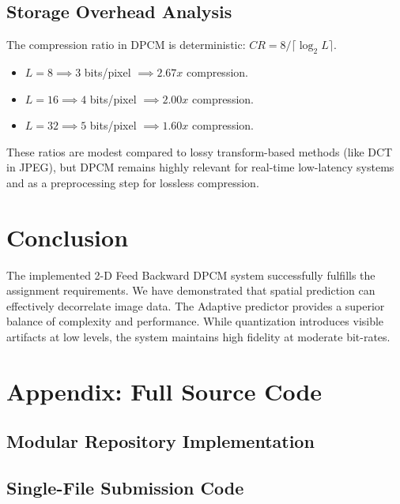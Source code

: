 \documentclass[12pt,a4paper]{article}
\begin{document}
\subsection{Storage Overhead Analysis}

The compression ratio in DPCM is deterministic: $CR = 8 / \lceil \log_2 L \rceil$. 
\begin{itemize}
    \item $L=8 \implies 3$ bits/pixel $\implies 2.67x$ compression.
    \item $L=16 \implies 4$ bits/pixel $\implies 2.00x$ compression.
    \item $L=32 \implies 5$ bits/pixel $\implies 1.60x$ compression.
\end{itemize}
These ratios are modest compared to lossy transform-based methods (like DCT in JPEG), but DPCM remains highly relevant for real-time low-latency systems and as a preprocessing step for lossless compression.

\section{Conclusion}

The implemented 2-D Feed Backward DPCM system successfully fulfills the assignment requirements. We have demonstrated that spatial prediction can effectively decorrelate image data. The Adaptive predictor provides a superior balance of complexity and performance. While quantization introduces visible artifacts at low levels, the system maintains high fidelity at moderate bit-rates.

\newpage

\section{Appendix: Full Source Code}

\subsection{Modular Repository Implementation}







\newpage

\subsection{Single-File Submission Code}


\end{document}
